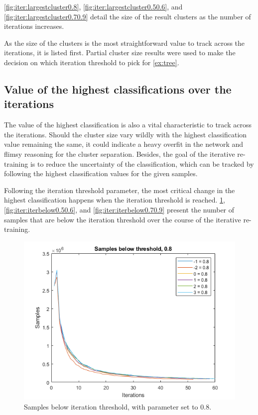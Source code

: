 \cref{fig:iter:largestcluster0.8}, \cref{fig:iter:largestcluster0.50.6}, and \cref{fig:iter:largestcluster0.70.9} detail the size of the result clusters as the number of iterations increases.

As the size of the clusters is the most straightforward value to track across the iterations, it is listed first.
Partial cluster size results were used to make the decision on which iteration threshold to pick for \cref{ex:tree}.

\subsection{Value of the highest classifications over the iterations}
The value of the highest classification is also a vital characteristic to track across the iterations.
Should the cluster size vary wildly with the highest classification value remaining the same, it could indicate a heavy overfit in the network and flimsy reasoning for the cluster separation.
Besides, the goal of the iterative re-training is to reduce the uncertainty of the classification, which can be tracked by following the highest classification values for the given samples.

Following the iteration threshold parameter, the most critical change in the highest classification happens when the iteration threshold is reached.
\cref{fig:iter:iterbelow0.8}, \cref{fig:iter:iterbelow0.50.6}, and \cref{fig:iter:iterbelow0.70.9} present the number of samples that are below the iteration threshold over the course of the iterative re-training.

\begin{figure}  %
  \centering
  \includegraphics[width=.7\textwidth]{figures/iterbelow-0.8.png}
  \caption{Samples below iteration threshold, with parameter set to 0.8.}
  \label{fig:iter:iterbelow0.8}
\end{figure}

